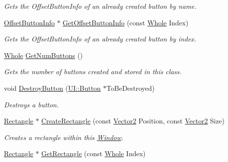 \begin{DoxyCompactItemize}
\begin{DoxyCompactList}\small\item\em Gets the OffsetButtonInfo of an already created button by name. \item\end{DoxyCompactList}\item 
\hyperlink{structphys_1_1UI_1_1ResizingInfo}{OffsetButtonInfo} $\ast$ \hyperlink{classphys_1_1UI_1_1Window_a2f940826aae5071b60a31beeb9fd0f27}{GetOffsetButtonInfo} (const \hyperlink{namespacephys_a460f6bc24c8dd347b05e0366ae34f34a}{Whole} Index)
\begin{DoxyCompactList}\small\item\em Gets the OffsetButtonInfo of an already created button by index. \item\end{DoxyCompactList}\item 
\hyperlink{namespacephys_a460f6bc24c8dd347b05e0366ae34f34a}{Whole} \hyperlink{classphys_1_1UI_1_1Window_a7eab9b4e1607a2b796072f60b6e3e0cd}{GetNumButtons} ()
\begin{DoxyCompactList}\small\item\em Gets the number of buttons created and stored in this class. \item\end{DoxyCompactList}\item 
void \hyperlink{classphys_1_1UI_1_1Window_a5a5bc10054d6e1d709b3b683a5554bf4}{DestroyButton} (\hyperlink{classphys_1_1UI_1_1Button}{UI::Button} $\ast$ToBeDestroyed)
\begin{DoxyCompactList}\small\item\em Destroys a button. \item\end{DoxyCompactList}\item 
\hyperlink{classphys_1_1UI_1_1Rectangle}{Rectangle} $\ast$ \hyperlink{classphys_1_1UI_1_1Window_a7a4e6a554f4b35200197242a779cde4a}{CreateRectangle} (const \hyperlink{classphys_1_1Vector2}{Vector2} Position, const \hyperlink{classphys_1_1Vector2}{Vector2} Size)
\begin{DoxyCompactList}\small\item\em Creates a rectangle within this \hyperlink{classphys_1_1UI_1_1Window}{Window}. \item\end{DoxyCompactList}\item 
\hyperlink{classphys_1_1UI_1_1Rectangle}{Rectangle} $\ast$ \hyperlink{classphys_1_1UI_1_1Window_a5cd67d1e89ceb52663f472e110e978b1}{GetRectangle} (const \hyperlink{namespacephys_a460f6bc24c8dd347b05e0366ae34f34a}{Whole} Index)

\end{DoxyCompactItemize}
